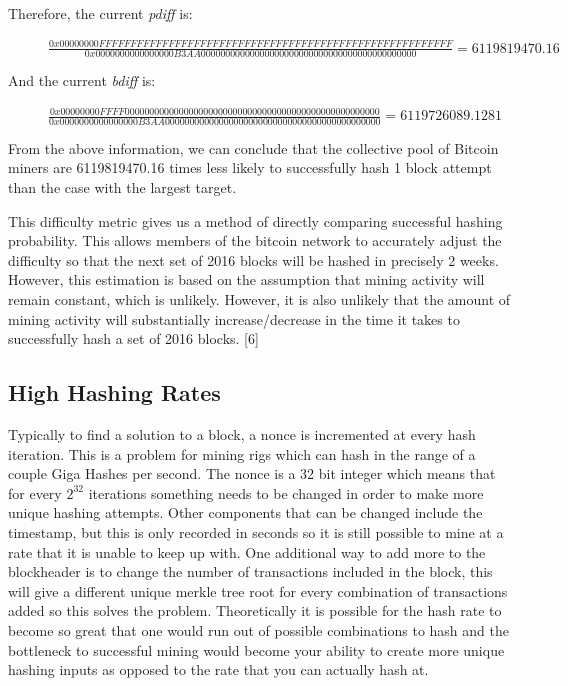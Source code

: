 \documentclass[pdftex,11pt]{article}
\begin{document}
Therefore, the current {\em pdiff} is:
\begin{figure}[H]
	\centering
 	$\frac{0x00000000FFFFFFFFFFFFFFFFFFFFFFFFFFFFFFFFFFFFFFFFFFFFFFFFFFFFFFFF}{0x0000000000000000B3AA00000000000000000000000000000000000000000000} = 6119819470.16$
 \end{figure}

And the current {\em bdiff} is:
\begin{figure}[H]
	\centering
 	$\frac{0x00000000FFFF0000000000000000000000000000000000000000000000000000}{0x0000000000000000B3AA00000000000000000000000000000000000000000000} =  6119726089.1281$
 \end{figure}

From the above information, we can conclude that the collective pool of Bitcoin miners are 6119819470.16 times less likely to successfully hash 1 block attempt than the case with the largest target. 

This difficulty metric gives us a method of directly comparing successful hashing probability. This allows members of the bitcoin network to accurately adjust the difficulty so that the next set of 2016 blocks will be hashed in precisely 2 weeks. However, this estimation is based on the assumption that mining activity will remain constant, which is unlikely. However, it is also unlikely that the amount of mining activity will substantially increase/decrease in the time it takes to successfully hash a set of 2016 blocks. [6]

\subsection{High Hashing Rates}
Typically to find a solution to a block, a nonce is incremented at every hash iteration. This is a problem for mining rigs which can hash in the range of a couple Giga Hashes per second. The nonce is a 32 bit integer which means that for every $2^{32}$ iterations something needs to be changed in order to make more unique hashing attempts. Other components that can be changed include the timestamp, but this is only recorded in seconds so it is still possible to mine at a rate that it is unable to keep up with. One additional way to add more to the blockheader is to change the number of transactions included in the block, this will give a different unique merkle tree root for every combination of transactions added so this solves the problem. Theoretically it is possible for the hash rate to become so great that one would run out of possible combinations to hash and the bottleneck to successful mining would become your ability to create more unique hashing inputs as opposed to the rate that you can actually hash at.
\end{document}
